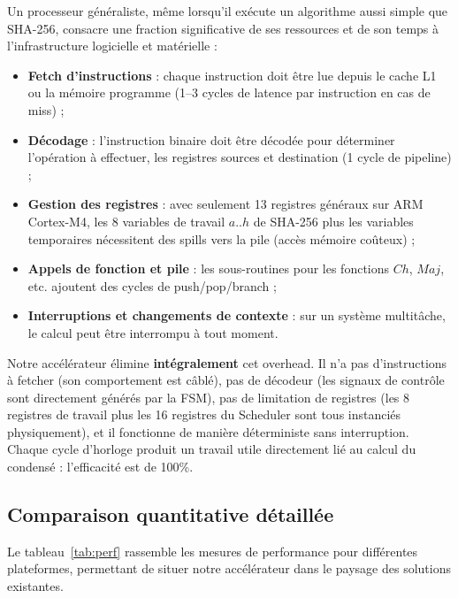 Un processeur généraliste, même lorsqu'il exécute un algorithme aussi simple que SHA-256, consacre une fraction significative de ses ressources et de son temps à l'infrastructure logicielle et matérielle :

\begin{itemize}
    \item \textbf{Fetch d'instructions} : chaque instruction doit être lue depuis le cache L1 ou la mémoire programme (1--3 cycles de latence par instruction en cas de miss) ;
    \item \textbf{Décodage} : l'instruction binaire doit être décodée pour déterminer l'opération à effectuer, les registres sources et destination (1 cycle de pipeline) ;
    \item \textbf{Gestion des registres} : avec seulement 13 registres généraux sur ARM Cortex-M4, les 8 variables de travail $a..h$ de SHA-256 plus les variables temporaires nécessitent des spills vers la pile (accès mémoire coûteux) ;
    \item \textbf{Appels de fonction et pile} : les sous-routines pour les fonctions $Ch$, $Maj$, etc. ajoutent des cycles de push/pop/branch ;
    \item \textbf{Interruptions et changements de contexte} : sur un système multitâche, le calcul peut être interrompu à tout moment.
\end{itemize}

Notre accélérateur élimine \textbf{intégralement} cet overhead. Il n'a pas d'instructions à fetcher (son comportement est câblé), pas de décodeur (les signaux de contrôle sont directement générés par la FSM), pas de limitation de registres (les 8 registres de travail plus les 16 registres du Scheduler sont tous instanciés physiquement), et il fonctionne de manière déterministe sans interruption. Chaque cycle d'horloge produit un travail utile directement lié au calcul du condensé : l'efficacité est de 100\%.

\subsection{Comparaison quantitative détaillée}

Le tableau~\ref{tab:perf} rassemble les mesures de performance pour différentes plateformes, permettant de situer notre accélérateur dans le paysage des solutions existantes.

